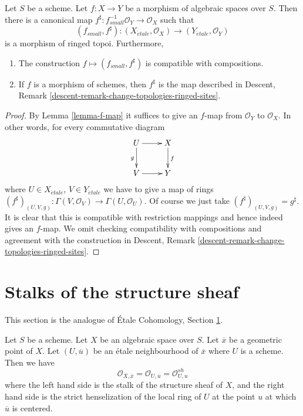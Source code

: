 \begin{lemma}
\label{lemma-morphism-ringed-topoi}
Let $S$ be a scheme.
Let $f : X \to Y$ be a morphism of algebraic spaces over $S$.
Then there is a canonical map
$f^\sharp : f_{small}^{-1}\mathcal{O}_Y \to \mathcal{O}_X$ such that
$$
(f_{small}, f^\sharp) :
(X_{\acute{e}tale}, \mathcal{O}_X)
\to
(Y_{\acute{e}tale}, \mathcal{O}_Y)
$$
is a morphism of ringed topoi. Furthermore,
\begin{enumerate}
\item The construction $f \mapsto (f_{small}, f^\sharp)$ is compatible with
compositions.
\item If $f$ is a morphism of schemes, then $f^\sharp$ is the map described in
Descent, Remark \ref{descent-remark-change-topologies-ringed-sites}.
\end{enumerate}
\end{lemma}

\begin{proof}
By Lemma \ref{lemma-f-map} it suffices to give an $f$-map from
$\mathcal{O}_Y$ to $\mathcal{O}_X$. In other words, for every
commutative diagram
$$
\xymatrix{
U \ar[d]_g \ar[r] & X \ar[d]^f \\
V \ar[r] & Y
}
$$
where $U \in X_{\acute{e}tale}$, $V \in Y_{\acute{e}tale}$ we have to give a
map of rings
$
(f^\sharp)_{(U, V, g)} :
\Gamma(V, \mathcal{O}_V)
\to
\Gamma(U, \mathcal{O}_U).
$
Of course we just take $(f^\sharp)_{(U, V, g)} = g^\sharp$.
It is clear that this is compatible with restriction mappings
and hence indeed gives an $f$-map.
We omit checking compatibility with compositions and agreement with the
construction in
Descent, Remark \ref{descent-remark-change-topologies-ringed-sites}.
\end{proof}







\section{Stalks of the structure sheaf}
\label{section-stalks-structure-sheaf}

\noindent
This section is the analogue of
\'Etale Cohomology, Section \ref{section-stalks-structure-sheaf}.

\begin{lemma}
\label{lemma-describe-etale-local-ring}
Let $S$ be a scheme.
Let $X$ be an algebraic space over $S$.
Let $\overline{x}$ be a geometric point of $X$.
Let $(U, \overline{u})$ be an \'etale neighbourhood of $\overline{x}$
where $U$ is a scheme. Then we have
$$
\mathcal{O}_{X, \overline{x}} =
\mathcal{O}_{U, \overline{u}} =
\mathcal{O}_{U, u}^{sh}
$$
where the left hand side is the stalk of the structure sheaf of $X$,
and the right hand side is the strict henselization of the local ring
of $U$ at the point $u$ at which $\overline{u}$ is centered.
\end{lemma}


